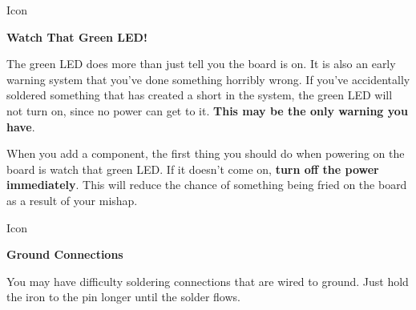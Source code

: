 Icon

\textbf{Watch That Green LED!}

The green LED does more than just tell you the board is on. It is also
an early warning system that you've done something horribly wrong. If
you've accidentally soldered something that has created a short in the
system, the green LED will not turn on, since no power can get to it.
\textbf{This may be the only warning you have}.

When you add a component, the first thing you should do when powering on
the board is watch that green LED. If it doesn't come on, \textbf{turn
off the power immediately}. This will reduce the chance of something
being fried on the board as a result of your mishap.

Icon

\textbf{Ground Connections}

You may have difficulty soldering connections that are wired to ground.
Just hold the iron to the pin longer until the solder flows.
